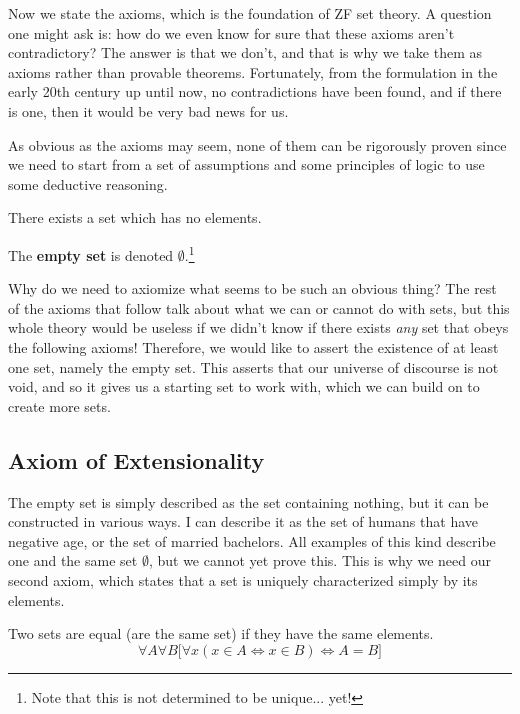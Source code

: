   Now we state the axioms, which is the foundation of ZF set theory. A question one might ask is: how do we even know for sure that these axioms aren't contradictory? The answer is that we don't, and that is why we take them as axioms rather than provable theorems. Fortunately, from the formulation in the early 20th century up until now, no contradictions have been found, and if there is one, then it would be very bad news for us.  
  
  As obvious as the axioms may seem, none of them can be rigorously proven since we need to start from a set of assumptions and some principles of logic to use some deductive reasoning. 

  \begin{axiom}
    There exists a set which has no elements. 
  \end{axiom}

  \begin{definition}
    The \textbf{empty set} is denoted $\emptyset$.\footnote{Note that this is not determined to be unique... yet!} 
  \end{definition}

  Why do we need to axiomize what seems to be such an obvious thing? The rest of the axioms that follow talk about what we can or cannot do with sets, but this whole theory would be useless if we didn't know if there exists \textit{any} set that obeys the following axioms! Therefore, we would like to assert the existence of at least one set, namely the empty set. This asserts that our universe of discourse is not void, and so it gives us a starting set to work with, which we can build on to create more sets.   

\subsection{Axiom of Extensionality} 

  The empty set is simply described as the set containing nothing, but it can be constructed in various ways. I can describe it as the set of humans that have negative age, or the set of married bachelors. All examples of this kind describe one and the same set $\emptyset$, but we cannot yet prove this. This is why we need our second axiom, which states that a set is uniquely characterized simply by its elements. 

  \begin{axiom}
    Two sets are equal (are the same set) if they have the same elements. 
    \begin{equation}
      \forall A \forall B \big[ \forall x (x \in A \iff x \in B) \iff A = B\big]
    \end{equation}
  \end{axiom} 

